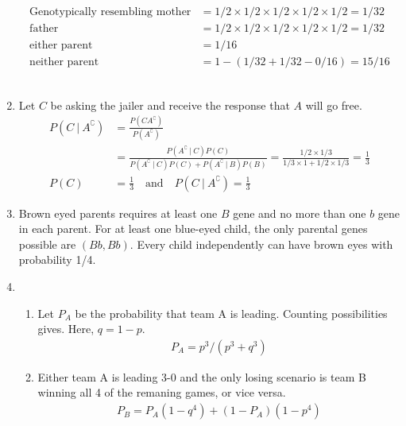 \begin{enumerate}
	\begin{subequations}
		\begin{align}
			\text{Genotypically resembling mother} &=  1/2 \times 1/2 \times 1/2 \times 1/2 \times 1/2  = 1/32\\
			\text{father} &=   1/2 \times 1/2 \times 1/2 \times 1/2 \times 1/2  = 1/32\\
			\text{either parent} &=  1/16 \\
			\text{neither parent} &=  1 - (1/32 + 1/32 - 0/16) = 15/16
		\end{align}
	\end{subequations}\\
	
	\item Let $ C $ be asking the jailer and receive the response that $ A $ will go free. 
	\begin{subequations}
		\begin{align}
			P(C\ |\ A^\complement) &= \frac{P(C A^\complement)}{P(A^\complement)} \\
			& = \frac{P(A^\complement\ |\ C) P(C)}{P(A^\complement\ |\ C) P(C) +P(A^\complement\ |\ B) P(B)}  = \frac{1/2 \times 1/3}{1/3 \times 1 + 1/2 \times 1/3} = \frac{1}{3}\\
			P(C) &= \frac{1}{3} \quad \text{and} \quad P(C\ |\ A^\complement) = \frac{1}{3}
		\end{align}
	\end{subequations}
	
	\item Brown eyed parents requires at least one $ B $ gene and no more than one $ b $ gene in each parent. For at least one blue-eyed child, the only parental genes possible are $ (Bb, Bb) $.
	Every child independently can have brown eyes with probability 1/4.
	
	\item \begin{enumerate}
		\item Let $ P_A $ be the probability that team A is leading. Counting possibilities gives.
		Here, $ q = 1-p $. 
		\begin{align}
			P_A = p^3 / (p^3 + q^3)
		\end{align}
		
		\item Either team A is leading 3-0 and the only losing scenario is team B winning all 4 of the remaning games, or vice versa. 
		\begin{align}
			P_B = P_A (1 - q^4) + (1 - P_A)(1 - p^4)
		\end{align}
		

\end{enumerate}
\end{enumerate}
